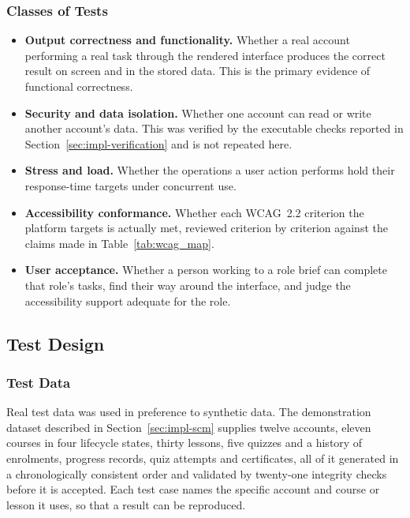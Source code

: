 \documentclass[12pt, oneside]{article} %
\begin{document}
\subsubsection{Classes of Tests}

\begin{itemize}
    \item \textbf{Output correctness and functionality.} Whether a real account performing a real task through the rendered interface produces the correct result on screen and in the stored data. This is the primary evidence of functional correctness.
    \item \textbf{Security and data isolation.} Whether one account can read or write another account's data. This was verified by the executable checks reported in Section~\ref{sec:impl-verification} and is not repeated here.
    \item \textbf{Stress and load.} Whether the operations a user action performs hold their response-time targets under concurrent use.
    \item \textbf{Accessibility conformance.} Whether each WCAG~2.2 criterion the platform targets is actually met, reviewed criterion by criterion against the claims made in Table~\ref{tab:wcag_map}.
    \item \textbf{User acceptance.} Whether a person working to a role brief can complete that role's tasks, find their way around the interface, and judge the accessibility support adequate for the role.
\end{itemize}

\subsection{Test Design}

\subsubsection{Test Data}

Real test data was used in preference to synthetic data. The demonstration dataset described in Section~\ref{sec:impl-scm} supplies twelve accounts, eleven courses in four lifecycle states, thirty lessons, five quizzes and a history of enrolments, progress records, quiz attempts and certificates, all of it generated in a chronologically consistent order and validated by twenty-one integrity checks before it is accepted. Each test case names the specific account and course or lesson it uses, so that a result can be reproduced.
\end{document}
